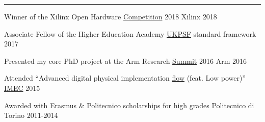 \vspace{-3mm}
\rule{\textwidth}{0.5pt}\vspace{-1mm}

\vspace{-1mm}
\begin{cvhonors}

\cvhonor
{Winner of the Xilinx Open Hardware
{\color{myblue}\href{http://www.openhw.eu/2018-finalists.html}{Competition}}
2018}
{Xilinx}
{}
{2018}

\cvhonor
{Associate Fellow of the Higher Education Academy} %
{{\color{myblue}\href{https://www.heacademy.ac.uk/ukpsf}{UKPSF}} standard 
framework} %
{} %
{2017} %

\cvhonor
{Presented my core PhD project at the Arm Research
{\color{myblue}\href{https://developer.arm.com/research/summit/previous-summits/2016/speakers}{Summit}}
 2016}
{Arm}
{}
{2016}

\cvhonor
{Attended ``Advanced digital physical implementation
{\color{myblue}\href{http://www.europractice.stfc.ac.uk/training/training_flyers/adpi20171024.pdf}{flow}}
 (feat. Low power)''}
{\color{myblue}\href{https://www.imec-int.com/en/about-us}{IMEC}}
{}
{2015}

\cvhonor
{Awarded with Erasmus \& Politecnico scholarships for high grades}
{Politecnico di Torino}
{}
{2011-2014}


\end{cvhonors}
